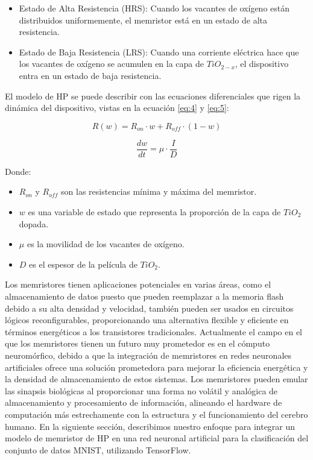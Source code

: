 \documentclass[conference]{IEEEtran}
\begin{document}
\begin{itemize}
	\item Estado de Alta Resistencia (HRS): Cuando los vacantes de oxígeno están distribuidos uniformemente, el memristor está en un estado de alta resistencia.
	\item Estado de Baja Resistencia (LRS): Cuando una corriente eléctrica hace que los vacantes de oxígeno se acumulen en la capa de $TiO_{2-x}$, el dispositivo entra en un estado de baja resistencia.
\end{itemize}

El modelo de HP se puede describir con las ecuaciones diferenciales que rigen la dinámica del dispositivo, vistas en la ecuación \ref{eq:4} y \ref{eq:5}:

\begin{equation}
	R(w) = R_{on} \cdot w + R_{off} \cdot (1 - w)
	\label{eq:4}
\end{equation}

\begin{equation}
	\frac{dw}{dt} = \mu \cdot \frac{I}{D}
	\label{eq:5}
\end{equation}

Donde:
\begin{itemize}
	\item $R_{on}$ y $R_{off}$ son las resistencias mínima y máxima del memristor.
	\item $w$ es una variable de estado que representa la proporción de la capa de $TiO_{2}$ dopada.
	\item $\mu$ es la movilidad de los vacantes de oxígeno.
	\item $D$ es el espesor de la película de $TiO_{2}$.
\end{itemize}

Los memristores tienen aplicaciones potenciales en varias áreas, como el almacenamiento de datos puesto que pueden reemplazar a la memoria flash debido a su alta densidad y velocidad, también pueden ser usados en circuitos lógicos reconfigurables, proporcionando una alternativa flexible y eficiente en términos energéticos a los transistores tradicionales. Actualmente el campo en el que los memristores tienen un futuro muy prometedor es en el cómputo neuromórfico, debido a que la integración de memristores en redes neuronales artificiales ofrece una solución prometedora para mejorar la eficiencia energética y la densidad de almacenamiento de estos sistemas. Los memristores pueden emular las sinapsis biológicas al proporcionar una forma no volátil y analógica de almacenamiento y procesamiento de información, alineando el hardware de computación más estrechamente con la estructura y el funcionamiento del cerebro humano. En la siguiente sección, describimos nuestro enfoque para integrar un modelo de memristor de HP en una red neuronal artificial para la clasificación del conjunto de datos MNIST, utilizando TensorFlow.
\end{document}
